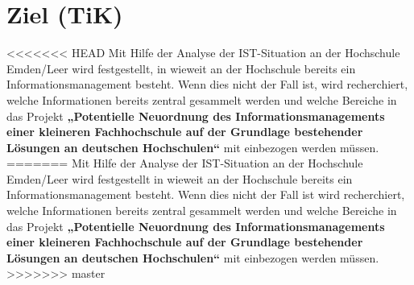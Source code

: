 \section{Ziel (TiK)}
<<<<<<< HEAD
Mit Hilfe der Analyse der IST-Situation an der Hochschule Emden/Leer wird festgestellt, in wieweit an der Hochschule bereits ein Informationsmanagement besteht. Wenn dies nicht der Fall ist, wird recherchiert, welche Informationen bereits zentral gesammelt werden und welche Bereiche in das Projekt \textbf{„Potentielle Neuordnung des Informationsmanagements einer kleineren Fachhochschule auf der Grundlage bestehender Lösungen an deutschen Hochschulen“} mit einbezogen werden müssen.
=======
Mit Hilfe der Analyse der IST-Situation an der Hochschule Emden/Leer wird festgestellt in wieweit an der Hochschule bereits ein Informationsmanagement besteht. Wenn dies nicht der Fall ist wird recherchiert, welche Informationen bereits zentral gesammelt werden und welche Bereiche in das Projekt \textbf{„Potentielle Neuordnung des Informationsmanagements einer kleineren Fachhochschule auf der Grundlage bestehender Lösungen an deutschen Hochschulen“} mit einbezogen werden müssen.
>>>>>>> master
